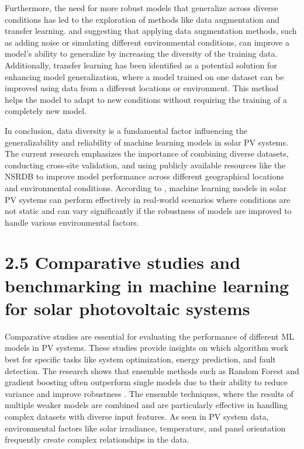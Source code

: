 Furthermore, the need for more robust models that generalize across diverse conditions has led to the exploration of methods like data augmentation and transfer learning. \parencite{Siddiqui et al._2020} and \parencite{Zhang et al._2020} suggesting that applying data augmentation methods, such as adding noise or simulating different environmental conditions, can improve a model’s ability to generalize by increasing the diversity of the training data. Additionally, transfer learning has been identified as a potential solution for enhancing model generalization, where a model trained on one dataset can be improved using data from a different locations or environment. This method helps the model to adapt to new conditions without requiring the training of a completely new model. 

In conclusion, data diversity is a fundamental factor influencing the generalizability and reliability of machine learning models in solar PV systems. The current research emphasizes the importance of combining diverse datasets, conducting cross-site validation, and using publicly available resources like the NSRDB to improve model performance across different geographical locations and environmental conditions. According to \parencite{Hayawi et al._2021}, machine learning models in solar PV systems can perform effectively in real-world scenarios where conditions are not static and can vary significantly if the robustness of models are improved to handle various environmental factors.

\section{2.5 Comparative studies and benchmarking in machine learning for solar photovoltaic systems}
Comparative studies are essential for evaluating the performance of different ML models in PV systems. These studies provide insights on which algorithm work best for specific tasks like system optimization, energy prediction, and fault detection. The research shows that ensemble methods such as Random Forest and gradient boosting often outperform single models due to their ability to reduce variance and improve robustness \parencite{Massidda et al._2025}. The ensemble techniques, where the results of multiple weaker models are combined and are particularly effective in handling complex datasets with diverse input features. As seen in PV system data, environmental factors like solar irradiance, temperature, and panel orientation frequently create complex relationships in the data.

